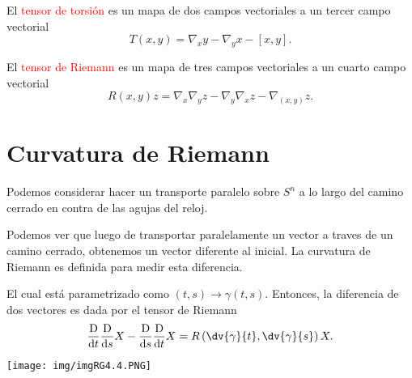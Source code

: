 \documentclass[../main]{subfiles}
\begin{document}
\begin{adjustwidth}{0pt}{-100pt}
 El \textcolor{red}{tensor de torsión} es un mapa de dos campos vectoriales a un tercer campo vectorial 
\begin{equation}
    T(x, y)=\nabla_x y-\nabla_y x-[x, y].
\end{equation}

 El \textcolor{red}{tensor de Riemann} es un mapa de tres campos vectoriales a un cuarto campo vectorial
\begin{equation}
    R(x, y)z=\nabla_x \nabla_y z-\nabla_y \nabla_x z-\nabla_{(x, y)}z.
\end{equation}

\section{Curvatura de Riemann}\label{part4.6}

\begin{minipage}{0.65\textwidth}
    Podemos considerar hacer un transporte paralelo sobre $S^n$ a lo largo del camino cerrado en contra de las agujas del reloj. 
    
    Podemos ver que luego de transportar paralelamente un vector a traves de un camino cerrado, obtenemos un vector diferente al inicial. La curvatura de Riemann es definida para medir esta diferencia. 

    El cual está parametrizado como $(t, s) \rightarrow \gamma(t, s)$. Entonces, la diferencia de dos vectores es dada por el tensor de Riemann 
    \begin{equation}
        \dfrac{\mathrm{D}}{\mathrm{d}t}\dfrac{\mathrm{D}}{\mathrm{d}s}X-\dfrac{\mathrm{D}}{\mathrm{d}s}\dfrac{\mathrm{D}}{\mathrm{d}t}X=R\left(\dv{\gamma}{t}, \dv{\gamma}{s}\right)X.
    \end{equation}
\end{minipage}
\begin{minipage}{0.5\textwidth}
\begin{adjustwidth}{10pt}{-80pt}
    \begin{center}
        \texttt{[image: img/imgRG4.4.PNG]}
    \end{center}
\end{adjustwidth}
\end{minipage}


\end{adjustwidth}
\end{document}
